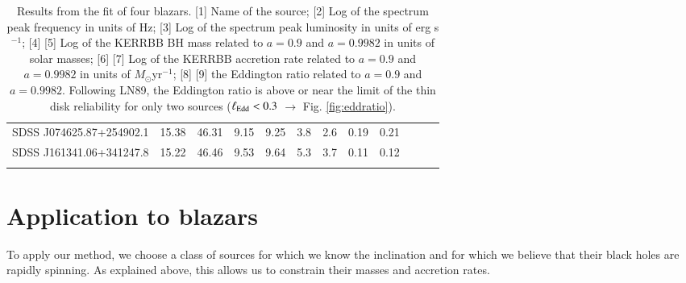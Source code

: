 \documentclass{aa}
\begin{document}
\begin{table*}
\begin{tabular}{llllllllllll}
SDSS J074625.87+254902.1 & 15.38 & \hspace{5mm} 46.31 & \hspace{5mm} 9.15 & \hspace{5mm} 9.25 & \hspace{5mm} 3.8 & \hspace{5mm} 2.6 & \hspace{5mm} 0.19 & \hspace{5mm} 0.21 \\

SDSS J161341.06+341247.8 & 15.22 & \hspace{5mm} 46.46 & \hspace{5mm} 9.53 & \hspace{5mm} 9.64 & \hspace{5mm} 5.3 &  \hspace{5mm} 3.7 & \hspace{5mm} 0.11 & \hspace{5mm} 0.12 \\
\hline \\
\end{tabular}
\caption{Results from the fit of four blazars. [1] Name of the source; [2] Log of the spectrum peak frequency in units of Hz; [3] Log of the spectrum peak luminosity in units of erg s$^{-1}$; [4] [5] Log of the KERRBB BH mass related to $a = 0.9$ and $a = 0.9982$ in units of solar masses; [6] [7] Log of the KERRBB accretion rate related to $a = 0.9$ and $a = 0.9982$ in units of $M_{\odot}$yr$^{-1}$; [8] [9] the Eddington ratio related to $a = 0.9$ and $a = 0.9982$. Following LN89, the Eddington ratio is above or near the limit of the thin disk reliability for only two sources ($\ell_{\rm Edd} < 0.3$ $\to$ Fig. \ref{fig:eddratio}).}
\label{fitdata}
\end{table*}









\section{Application to blazars} \label{appl}

To apply our method, we choose a class of sources for which we know the inclination and for which we believe that their black holes
are rapidly spinning. As explained above, this allows us to constrain their masses and accretion rates.
\end{document}
